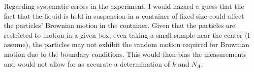 \documentclass[paper=a4, fontsize=11pt]{scrartcl} %
\numberwithin{equation}{section} %
\numberwithin{figure}{section} %
\numberwithin{table}{section} %
\numberwithin{equation}{subsection}
\begin{document}
Regarding systematic errors in the experiment, I would hazard a guess that the fact that the liquid is held in suspension in a container of fixed size could affect the particles' Brownian motion in the container. Given that the particles are restricted to motion in a given box, even taking a small sample near the center (I assume), the particles may not exhibit the random motion required for Brownian motion due to the boundary conditions. This would then bias the measurements and would not allow for as accurate a determination of $k$ and $N_A$.


\end{document}
